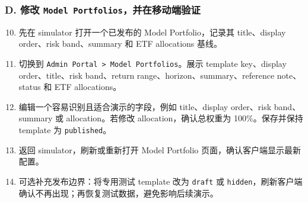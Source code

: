\subsubsection{D. 修改 \texttt{Model Portfolios}，并在移动端验证}
\begin{enumerate}
\setcounter{enumi}{9}
\item 先在 simulator 打开一个已发布的 Model Portfolio，记录其 title、display order、risk band、summary 和 ETF allocations 基线。
\item 切换到 \texttt{Admin Portal \textgreater{} Model Portfolios}。展示 template key、display order、title、risk band、return range、horizon、summary、reference note、status 和 ETF allocations。
\item 编辑一个容易识别且适合演示的字段，例如 title、display order、risk band、summary 或 allocation。若修改 allocation，确认总权重为 100\%。保存并保持 template 为 \texttt{published}。
\item 返回 simulator，刷新或重新打开 Model Portfolio 页面，确认客户端显示最新配置。
\item 可选补充发布边界：将专用测试 template 改为 \texttt{draft} 或 \texttt{hidden}，刷新客户端确认不再出现；再恢复测试数据，避免影响后续演示。
\end{enumerate}
